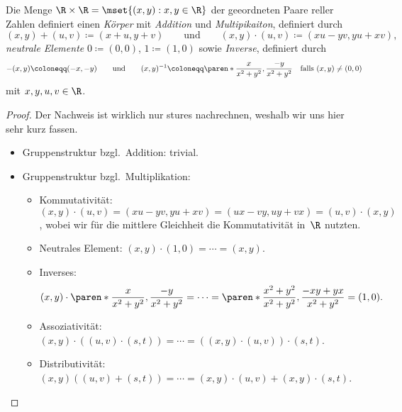 \documentclass[a4paper]{article}
\begin{document}
\begin{theorem}\label{thm:complexnumbers}
    Die Menge $\R\times\R = \mset{(x,y) : x,y \in \R}$ der geeordneten Paare reller Zahlen definiert einen \emph{Körper} mit \emph{Addition} und \emph{Multipikaiton}, definiert durch
    \begin{equation*}
        (x,y) + (u,v) \coloneqq (x+u,y+v) \qquad\text{und}\qquad (x,y) \cdot (u,v) \coloneqq (xu-yv,yu+xv),
    \end{equation*}
    \emph{neutrale Elemente} $0 \coloneqq (0, 0)$, $1 \coloneqq (1, 0)$ sowie \emph{Inverse}, definiert durch
    \begin{equation*}
        -(x,y) \coloneqq (-x,-y) \qquad\text{und}\qquad (x,y)^{-1} \coloneqq \paren*{\frac{x}{x^2+y^2},\frac{-y}{x^2+y^2}} \quad\text{falls } (x,y) \neq (0, 0)
    \end{equation*}
    mit $x,y,u,v \in \R$.
\end{theorem}

\begin{proof}
    Der Nachweis ist wirklich nur stures nachrechnen, weshalb wir uns hier sehr kurz fassen.
    \begin{itemize}
        \item Gruppenstruktur bzgl.\ Addition: trivial.
        \item Gruppenstruktur bzgl.\ Multiplikation:
        \begin{itemize}
            \item Kommutativität: $(x,y) \cdot (u,v) = (xu-yv,yu+xv) = (ux-vy,uy+vx) = (u,v) \cdot (x,y)$, wobei wir für die mittlere Gleichheit die Kommutativität in~$\R$ nutzten.
            \item Neutrales Element: $(x,y) \cdot (1, 0) = \cdots = (x,y)$.
            \item Inverses:
            \begin{equation*}
                (x,y) \cdot \paren*{\frac{x}{x^2+y^2},\frac{-y}{x^2+y^2}} = \cdots = \paren*{\frac{x^2+y^2}{x^2+y^2},\frac{-xy+yx}{x^2+y^2}} = (1, 0).
            \end{equation*}
            \item Assoziativität: $(x,y) \cdot ((u,v) \cdot (s,t)) = \cdots = ((x,y) \cdot (u,v)) \cdot (s,t)$.
            \item Distributivität: $(x,y) ((u,v) + (s,t)) = \cdots = (x,y)\cdot(u,v) + (x,y)\cdot(s,t)$.\qedhere
        \end{itemize}
    \end{itemize}
\end{proof}
\end{document}
